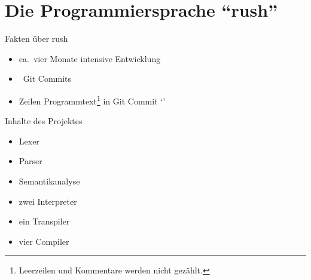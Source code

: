 \section{Die Programmiersprache \enquote{rush}}

\begin{frame}{Fakten über rush}
	\begin{figure}[h]
		\flushleft
		\hspace{.15cm} 
		\vspace{.2cm}
	\end{figure}
	\begin{itemize}
		\item ca.\ vier Monate intensive Entwicklung
		\item \rushCountCommits~Git Commits
		\item {} Zeilen Programmtext\footnote{Leerzeilen und Kommentare werden nicht gezählt.} in Git Commit `\rushCommit'
	\end{itemize}
\end{frame}

\begin{frame}{Inhalte des Projektes}
	\begin{itemize}
		\item Lexer
		\item Parser
		\item Semantikanalyse
		\item zwei Interpreter
		\item ein Transpiler
		\item vier Compiler
	\end{itemize}
\end{frame}

